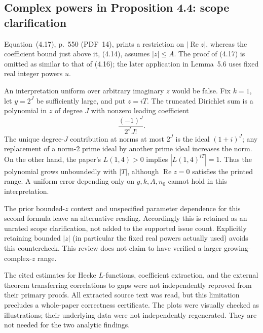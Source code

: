 \documentclass[10pt]{article}
\begin{document}
\subsection*{Complex powers in Proposition 4.4: scope clarification}
Equation (4.17), p. 550 (PDF 14), prints a restriction on \(|\operatorname{Re}z|\), whereas the coefficient bound just above it, (4.14), assumes \(|z|\le A\). The proof of (4.17) is omitted as similar to that of (4.16); the later application in Lemma 5.6 uses fixed real integer powers \(u\).\par
An interpretation uniform over arbitrary imaginary \(z\) would be false. Fix \(k=1\), let \(y=2^J\) be sufficiently large, and put \(z=iT\). The truncated Dirichlet sum is a polynomial in \(z\) of degree \(J\) with nonzero leading coefficient \[\frac{(-1)^J}{2^J J!}.\] The unique degree-\(J\) contribution at norms at most \(2^J\) is the ideal \((1+i)^J\); any replacement of a norm-2 prime ideal by another prime ideal increases the norm. On the other hand, the paper’s \(L(1,4)>0\) implies \(|L(1,4)^{iT}|=1\). Thus the polynomial grows unboundedly with \(|T|\), although \(\operatorname{Re}z=0\) satisfies the printed range. A uniform error depending only on \(y,k,A,n_0\) cannot hold in this interpretation.\par
The prior bounded-\(z\) context and unspecified parameter dependence for this second formula leave an alternative reading. Accordingly this is retained as an unrated scope clarification, not added to the supported issue count. Explicitly retaining bounded \(|z|\) (in particular the fixed real powers actually used) avoids this countercheck. This review does not claim to have verified a larger growing-complex-\(z\) range.\par
The cited estimates for Hecke \(L\)-functions, coefficient extraction, and the external theorem transferring correlations to gaps were not independently reproved from their primary proofs. All extracted source text was read, but this limitation precludes a whole-paper correctness certificate. The plots were visually checked as illustrations; their underlying data were not independently regenerated. They are not needed for the two analytic findings.\par
\end{document}
